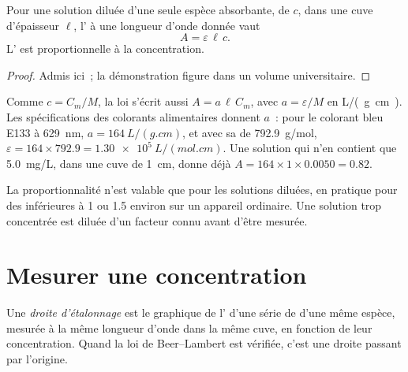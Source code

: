 \begin{proposition}\label{prop:g11:absorbance:beer-lambert}
Pour une solution diluée d'une seule espèce absorbante, de  $c$, dans une cuve d'épaisseur $\ell$, l' à une
longueur d'onde donnée vaut
\[
  A = \varepsilon\, \ell\, c .
\]
L' est proportionnelle à la concentration.
\end{proposition}

\begin{proof}
Admis ici~; la démonstration figure dans un volume universitaire.
\end{proof}


\begin{remark}\label{rem:g11:absorbance:mass}
Comme $c = C_m / M$, la loi s'écrit aussi $A = a\, \ell\, C_m$, avec
$a = \varepsilon / M$ en \si{L/(g.cm)}. Les spécifications des colorants
alimentaires donnent $a$~: pour le colorant bleu E133 à \qty{629}{nm}, $a =
\qty{164}{L/(g.cm)}$, et avec sa  de \qty{792.9}{g/mol},
$\varepsilon = 164 \times 792.9 = \qty{1.30e5}{L/(mol.cm)}$. Une solution
qui n'en contient que \qty{5.0}{mg/L}, dans une cuve de \qty{1}{cm},
donne déjà
$A = 164 \times 1 \times 0.0050 = 0.82$.
\end{remark}

\begin{remark}\label{rem:g11:absorbance:dilute}
La proportionnalité n'est valable que pour les solutions diluées, en
pratique pour des  inférieures à 1 ou 1.5 environ sur un
appareil ordinaire. Une solution trop concentrée est diluée d'un facteur
connu avant d'être mesurée.
\end{remark}

\section{Mesurer une concentration}

\begin{definition}\label{def:g11:absorbance:calibration-line}
Une \emph{droite d'étalonnage} est le
graphique de l' d'une série de  d'une même
espèce, mesurée à la même longueur d'onde dans la même cuve, en fonction
de leur concentration. Quand la loi de Beer--Lambert est vérifiée, c'est
une droite passant par l'origine.
\end{definition}


